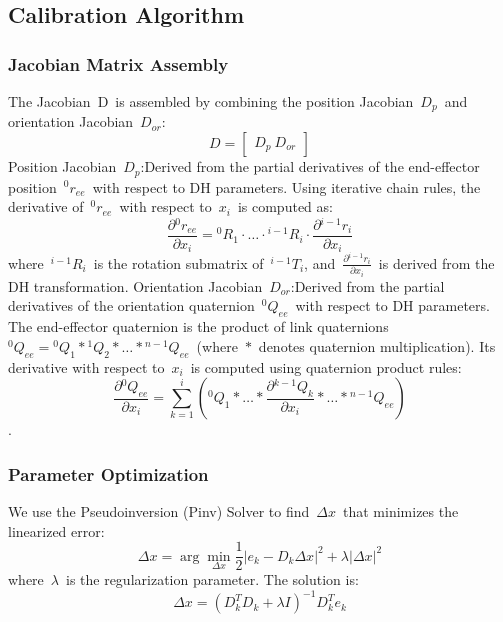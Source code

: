 \documentclass[conference]{IEEEtran}
\begin{document}
\subsection{Calibration Algorithm}
\subsubsection{Jacobian Matrix Assembly}
The Jacobian D is assembled by combining the position Jacobian \(D_p\) and orientation Jacobian \(D_{or}\):
\begin{equation}
D = \begin{bmatrix} D_p \ D_{or} \end{bmatrix}
\end{equation}Position Jacobian \(D_p\):Derived from the partial derivatives of the end-effector position \(^0r_{ee}\) with respect to DH parameters. Using iterative chain rules, the derivative of \(^0r_{ee}\) with respect to \(x_i\) is computed as:
\begin{equation}
\frac{\partial {}^0r_{ee}}{\partial x_i} = {}^0R_1 \cdot \dots \cdot {}^{i-1}R_i \cdot \frac{\partial {}^{i-1}r_i}{\partial x_i}
\end{equation}
where \(^{i-1}R_i\) is the rotation submatrix of \(^{i-1}T_i\), and \(\frac{\partial {}^{i-1}r_i}{\partial x_i}\) is derived from the DH transformation. Orientation Jacobian \(D_{or}\):Derived from the partial derivatives of the orientation quaternion \(^0Q_{ee}\) with respect to DH parameters. The end-effector quaternion is the product of link quaternions \(^0Q_{ee} = {}^0Q_1 \ast {}^1Q_2 \ast \dots \ast {}^{n-1}Q_{ee}\) (where \(\ast\) denotes quaternion multiplication). Its derivative with respect to \(x_i\) is computed using quaternion product rules:
\begin{equation}
\frac{\partial {}^0Q_{ee}}{\partial x_i} = \sum_{k=1}^i \left( {}^0Q_1 \ast \dots \ast \frac{\partial {}^{k-1}Q_k}{\partial x_i} \ast \dots \ast {}^{n-1}Q_{ee} \right)
\end{equation}.

\subsubsection{Parameter Optimization}
We use the Pseudoinversion (Pinv) Solver to find \(\Delta x\) that minimizes the linearized error:
\begin{equation}
\Delta x = \arg\min_{\Delta x} \frac{1}{2} | e_k - D_k \Delta x |^2 + \lambda | \Delta x |^2
\end{equation}
where \(\lambda\) is the regularization parameter. The solution is:
\begin{equation}
\Delta x = (D_k^T D_k + \lambda I)^{-1} D_k^T e_k
\end{equation}
\end{document}
